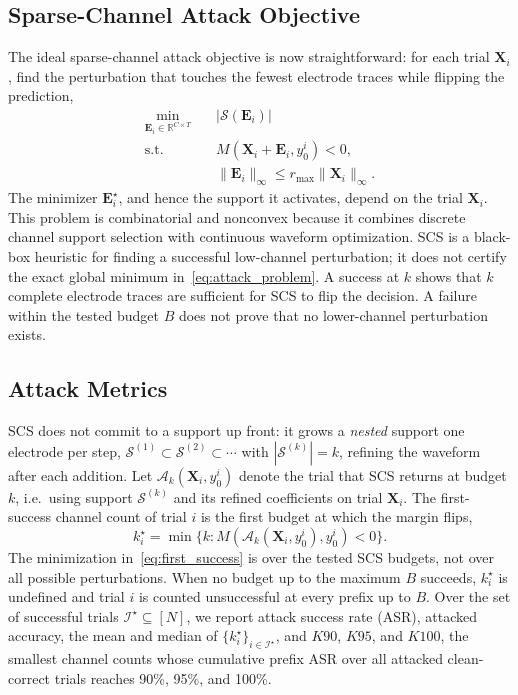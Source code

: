 \documentclass[journal]{IEEEtran}
\begin{document}
\subsection{Sparse-Channel Attack Objective}

The ideal sparse-channel attack objective is now straightforward: for each trial $\mathbf{X}_i$, find the perturbation that touches the fewest electrode traces while flipping the prediction,
\begin{equation}
\begin{aligned}
\min_{\mathbf{E}_i\in\mathbb{R}^{C\times T}} \quad
& |\mathcal{S}(\mathbf{E}_i)| \\
\mathrm{s.t.}\quad
& M(\mathbf{X}_i+\mathbf{E}_i,y_0^i)<0,\\
& \|\mathbf{E}_i\|_{\infty}\leq r_{\max}\|\mathbf{X}_i\|_{\infty}.
\end{aligned}
\label{eq:attack_problem}
\end{equation}
The minimizer $\mathbf{E}_i^\star$, and hence the support it activates, depend on the trial $\mathbf{X}_i$. This problem is combinatorial and nonconvex because it combines discrete channel support selection with continuous waveform optimization. SCS is a black-box heuristic for finding a successful low-channel perturbation; it does not certify the exact global minimum in~\eqref{eq:attack_problem}. A success at $k$ shows that $k$ complete electrode traces are sufficient for SCS to flip the decision. A failure within the tested budget $B$ does not prove that no lower-channel perturbation exists.

\subsection{Attack Metrics}

SCS does not commit to a support up front: it grows a \emph{nested} support one electrode per step, $\mathcal{S}^{(1)}\subset\mathcal{S}^{(2)}\subset\cdots$ with $|\mathcal{S}^{(k)}|=k$, refining the waveform after each addition. Let $\mathcal{A}_k(\mathbf{X}_i,y_0^i)$ denote the trial that SCS returns at budget $k$, i.e.\ using support $\mathcal{S}^{(k)}$ and its refined coefficients on trial $\mathbf{X}_i$. The first-success channel count of trial $i$ is the first budget at which the margin flips,
\begin{equation}
k_i^\star=\min\{k:M(\mathcal{A}_k(\mathbf{X}_i,y_0^i),y_0^i)<0\}.
\label{eq:first_success}
\end{equation}
The minimization in~\eqref{eq:first_success} is over the tested SCS budgets, not over all possible perturbations. When no budget up to the maximum $B$ succeeds, $k_i^\star$ is undefined and trial $i$ is counted unsuccessful at every prefix up to $B$. Over the set of successful trials $\mathcal{I}^\star\subseteq[N]$, we report attack success rate (ASR), attacked accuracy, the mean and median of $\{k_i^\star\}_{i\in\mathcal{I}^\star}$, and $K90$, $K95$, and $K100$, the smallest channel counts whose cumulative prefix ASR over all attacked clean-correct trials reaches 90\%, 95\%, and 100\%.
\end{document}
